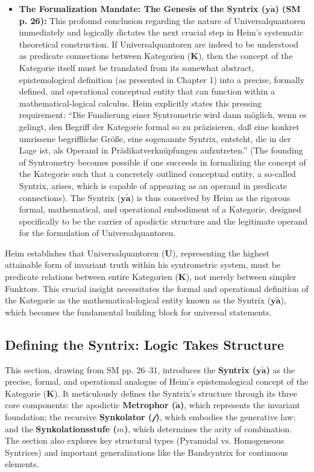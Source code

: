 \documentclass[12pt]{article}
\newcommand{\q}[1]{\enquote{#1}}
\newcommand{\kategorie}{\bm{K}}
\newcommand{\syntrix}{\bm{y\widetilde{a}}}
\newcommand{\metrophor}{\bm{\widetilde{a}}}
\newcommand{\synkolator}{\mathcal{f}}
\newcommand{\synkolationsstufe}{m}
\newcommand{\universalquantor}{\bm{U}}
\begin{document}
\begin{itemize}
    \item \textbf{The Formalization Mandate: The Genesis of the Syntrix (\(\syntrix\)) (SM p. 26):}
    This profound conclusion regarding the nature of Universalquantoren immediately and logically dictates the next crucial step in Heim's systematic theoretical construction. If Universalquantoren are indeed to be understood as predicate connections between Kategorien (\(\kategorie\)), then the concept of the Kategorie itself must be translated from its somewhat abstract, epistemological definition (as presented in Chapter 1) into a precise, formally defined, and operational conceptual entity that can function within a mathematical-logical calculus. Heim explicitly states this pressing requirement: \q{Die Fundierung einer Syntrometrie wird dann möglich, wenn es gelingt, den Begriff der Kategorie formal so zu präzisieren, daß eine konkret umrissene begriffliche Größe, eine sogenannte Syntrix, entsteht, die in der Lage ist, als Operand in Prädikatverknüpfungen aufzutreten.} (The founding of Syntrometry becomes possible if one succeeds in formalizing the concept of the Kategorie such that a concretely outlined conceptual entity, a so-called Syntrix, arises, which is capable of appearing as an operand in predicate connections). The Syntrix (\(\syntrix\)) is thus conceived by Heim as the rigorous formal, mathematical, and operational embodiment of a Kategorie, designed specifically to be the carrier of apodictic structure and the legitimate operand for the formulation of Universalquantoren.
\end{itemize}

Heim establishes that Universalquantoren (\(\universalquantor\)), representing the highest attainable form of invariant truth within his syntrometric system, must be predicate relations between entire Kategorien (\(\kategorie\)), not merely between simpler Funktors. This crucial insight necessitates the formal and operational definition of the Kategorie as the mathematical-logical entity known as the Syntrix (\(\syntrix\)), which becomes the fundamental building block for universal statements.

\subsection{Defining the Syntrix: Logic Takes Structure}
\label{sec:syntrix_definition}

This section, drawing from SM pp. 26--31, introduces the \textbf{Syntrix (\(\syntrix\))} as the precise, formal, and operational analogue of Heim's epistemological concept of the Kategorie (\(\kategorie\)). It meticulously defines the Syntrix's structure through its three core components: the apodictic \textbf{Metrophor (\(\metrophor\))}, which represents the invariant foundation; the recursive \textbf{Synkolator (\(\synkolator\))}, which embodies the generative law; and the \textbf{Synkolationsstufe (\(\synkolationsstufe\))}, which determines the arity of combination. The section also explores key structural types (Pyramidal vs. Homogeneous Syntrices) and important generalizations like the Bandsyntrix for continuous elements.
\end{document}
